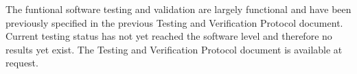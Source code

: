 \documentclass{article}
\begin{document}
The funtional software testing and validation are largely functional
and have been previously specified in the previous Testing and
Verification Protocol document. Current testing status has not yet
reached the software level and therefore no results yet exist. The
Testing and Verification Protocol document is available at request.





\newpage
{}


\end{document}
